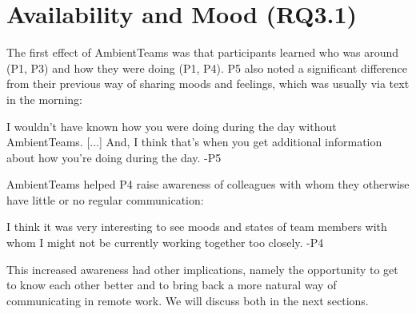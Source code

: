 


\section{Availability and Mood (RQ3.1)}
\label{section:availability_and_mood}
The first effect of AmbientTeams was that participants learned who was around (P1, P3) and how they were doing (P1, P4). P5 also noted a significant difference from their previous way of sharing moods and feelings, which was usually via text in the morning:


\begin{displayquote}[][]
    [...] I wouldn't have known how you were doing during the day without AmbientTeams. [...] And, I think that's when you get additional information about how you're doing during the day. -P5
\end{displayquote}

AmbientTeams helped P4 raise awareness of colleagues with whom they otherwise have little or no regular communication:

\begin{displayquote}
    I think it was very interesting to see moods and states of team members with whom I might not be currently working together too closely. -P4
\end{displayquote}

This increased awareness had other implications, namely the opportunity to get to know each other better and to bring back a more natural way of communicating in remote work. We will discuss both in the next sections.

